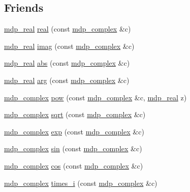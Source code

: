 \subsection*{Friends}
\begin{DoxyCompactItemize}
\item 
\hyperlink{mdp__global__vars_8h_a69d96b74c791e0bbdb888b3913a69450}{mdp\+\_\+real} \hyperlink{classmdp__complex_ac1595428e446b7ae72e170eabfd8b94f}{real} (const \hyperlink{classmdp__complex}{mdp\+\_\+complex} \&c)
\item 
\hyperlink{mdp__global__vars_8h_a69d96b74c791e0bbdb888b3913a69450}{mdp\+\_\+real} \hyperlink{classmdp__complex_a8a04c5512f11ace74b3f0a259c6be300}{imag} (const \hyperlink{classmdp__complex}{mdp\+\_\+complex} \&c)
\item 
\hyperlink{mdp__global__vars_8h_a69d96b74c791e0bbdb888b3913a69450}{mdp\+\_\+real} \hyperlink{classmdp__complex_a96b9b3b51ad22585b81f00888633ca37}{abs} (const \hyperlink{classmdp__complex}{mdp\+\_\+complex} \&c)
\item 
\hyperlink{mdp__global__vars_8h_a69d96b74c791e0bbdb888b3913a69450}{mdp\+\_\+real} \hyperlink{classmdp__complex_ab34d0f24b00ee0467009d6cb6c992ae1}{arg} (const \hyperlink{classmdp__complex}{mdp\+\_\+complex} \&c)
\item 
\hyperlink{classmdp__complex}{mdp\+\_\+complex} \hyperlink{classmdp__complex_ab20fc6334d41fa698d4ab5c4d83386b7}{pow} (const \hyperlink{classmdp__complex}{mdp\+\_\+complex} \&c, \hyperlink{mdp__global__vars_8h_a69d96b74c791e0bbdb888b3913a69450}{mdp\+\_\+real} z)
\item 
\hyperlink{classmdp__complex}{mdp\+\_\+complex} \hyperlink{classmdp__complex_ab967861ba5a992ba73f0aad6e6a80def}{sqrt} (const \hyperlink{classmdp__complex}{mdp\+\_\+complex} \&c)
\item 
\hyperlink{classmdp__complex}{mdp\+\_\+complex} \hyperlink{classmdp__complex_a0ea103d549cac56c68b3cd38bb9d9ff2}{exp} (const \hyperlink{classmdp__complex}{mdp\+\_\+complex} \&c)
\item 
\hyperlink{classmdp__complex}{mdp\+\_\+complex} \hyperlink{classmdp__complex_ab01054c3b4d1c10d13833c8d069a09f6}{sin} (const \hyperlink{classmdp__complex}{mdp\+\_\+complex} \&c)
\item 
\hyperlink{classmdp__complex}{mdp\+\_\+complex} \hyperlink{classmdp__complex_a8829f2575ae9740dcf980ca42a9b1076}{cos} (const \hyperlink{classmdp__complex}{mdp\+\_\+complex} \&c)
\item 
\hyperlink{classmdp__complex}{mdp\+\_\+complex} \hyperlink{classmdp__complex_a4c38de484596ed698718b739631e4256}{times\+\_\+i} (const \hyperlink{classmdp__complex}{mdp\+\_\+complex} \&c)

\end{DoxyCompactItemize}
